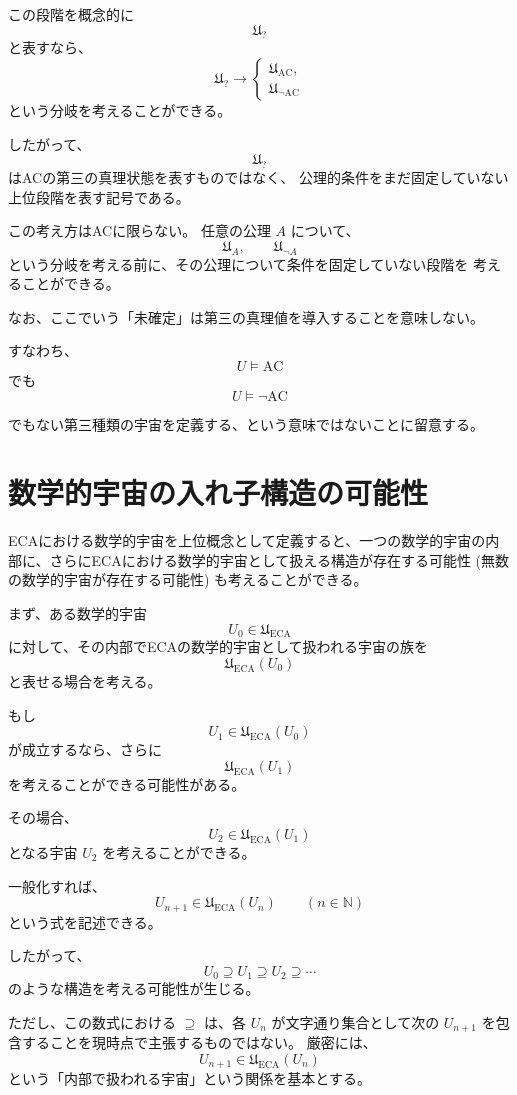 \documentclass[11pt,a4paper]{article}
\begin{document}
この段階を概念的に
\[
\mathfrak{U}_{?}
\]
と表すなら、
\[
\mathfrak{U}_{?}
\longrightarrow
\begin{cases}
\mathfrak{U}_{\mathrm{AC}},\\[2mm]
\mathfrak{U}_{\neg\mathrm{AC}}
\end{cases}
\]
という分岐を考えることができる。

したがって、
\[
\mathfrak{U}_{?}
\]
はACの第三の真理状態を表すものではなく、
公理的条件をまだ固定していない上位段階を表す記号である。

この考え方はACに限らない。
任意の公理 \(A\) について、
\[
\mathfrak{U}_{A},
\qquad
\mathfrak{U}_{\neg A}
\]
という分岐を考える前に、その公理について条件を固定していない段階を
考えることができる。

なお、ここでいう「未確定」は第三の真理値を導入することを意味しない。

すなわち、
\[
U\models\mathrm{AC}
\]
でも
\[
U\models\neg\mathrm{AC}
\]

でもない第三種類の宇宙を定義する、という意味ではないことに留意する。


\section{数学的宇宙の入れ子構造の可能性}

ECAにおける数学的宇宙を上位概念として定義すると、一つの数学的宇宙の内部に、さらにECAにおける数学的宇宙として扱える構造が存在する可能性 (無数の数学的宇宙が存在する可能性) も考えることができる。

まず、ある数学的宇宙
\[
U_0\in\mathfrak{U}_{\mathrm{ECA}}
\]
に対して、その内部でECAの数学的宇宙として扱われる宇宙の族を
\[
\mathfrak{U}_{\mathrm{ECA}}(U_0)
\]
と表せる場合を考える。

もし
\[
U_1\in\mathfrak{U}_{\mathrm{ECA}}(U_0)
\]
が成立するなら、さらに
\[
\mathfrak{U}_{\mathrm{ECA}}(U_1)
\]
を考えることができる可能性がある。

その場合、
\[
U_2\in\mathfrak{U}_{\mathrm{ECA}}(U_1)
\]
となる宇宙 \(U_2\) を考えることができる。

一般化すれば、
\[
\boxed{
U_{n+1}\in\mathfrak{U}_{\mathrm{ECA}}(U_n)
}
\qquad(n\in\mathbb N)
\]
という式を記述できる。

したがって、
\[
U_0
\supseteq U_1
\supseteq U_2
\supseteq\cdots
\]
のような構造を考える可能性が生じる。

ただし、この数式における $\supseteq$ は、各 $U_n$ が文字通り集合として次の $U_{n+1}$ を包含することを現時点で主張するものではない。
厳密には、
\[
U_{n+1}\in\mathfrak{U}_{\mathrm{ECA}}(U_n)
\]
という「内部で扱われる宇宙」という関係を基本とする。
\end{document}
